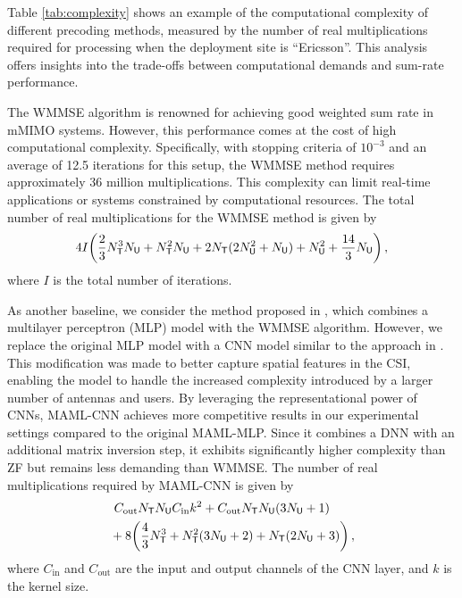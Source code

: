 
Table \ref{tab:complexity} shows an example of the computational complexity of different precoding methods, measured by the number of real multiplications required for processing when the deployment site is ``Ericsson''. This analysis offers insights into the trade-offs between computational demands and sum-rate performance.

The \gls{WMMSE} algorithm is renowned for achieving good weighted sum rate in mMIMO systems. However, this performance comes at the cost of high computational complexity. Specifically, with stopping criteria of $10^{-3}$ and an average of 12.5 iterations for this setup, the WMMSE method requires approximately 36 million multiplications. This complexity can limit real-time applications or systems constrained by computational resources. The total number of real multiplications for the WMMSE method is given by
\[
 4I \bigg(\frac{2}{3} N_{\sf{T}}^3N_{\sf{U}} + N_{\sf{T}}^2N_{\sf{U}} + 2N_{\sf{T}}(2N_{\sf{U}}^2+N_{\sf{U}})+ N_{\sf{U}}^2+\frac{14}{3}N_{\sf{U}}\bigg) \, ,
\]
where $I$ is the total number of iterations. 

As another baseline, we consider the method proposed in \cite{lyu2023downlink}, which combines a multilayer perceptron (MLP) model with the WMMSE algorithm. However, we replace the original MLP model with a CNN model similar to the approach in \cite{hojatian2021unsupervised}.
This modification was made to better capture spatial features in the \gls{CSI}, enabling the model to handle the increased complexity introduced by a larger number of antennas and users. By leveraging the representational power of CNNs, MAML-CNN achieves more competitive results in our experimental settings compared to the original MAML-MLP. Since it combines a \gls{DNN} with an additional matrix inversion step, it exhibits significantly higher complexity than \gls{ZF} but remains less demanding than WMMSE. 
The number of real multiplications required by MAML-CNN is given by
\begin{align*}
 & \
C_{\text{out}}N_{\sf{T}}N_{\sf{U}}C_{\text{in}}k^2 + C_{\text{out}}N_{\sf{T}}N_{\sf{U}}(3N_{\sf{U}}+1) \\
  & + 8\bigg(\frac{4}{3} N_{\sf{T}}^3 + N_{\sf{T}}^2 (3N_{\sf{U}}+2) + N_{\sf{T}}(2N_{\sf{U}}+3)\bigg) \, ,
\end{align*}
where $C_{\text{in}}$ and  $C_{\text{out}}$ are the input and output channels of the CNN layer, and $k$  is the kernel size. 

